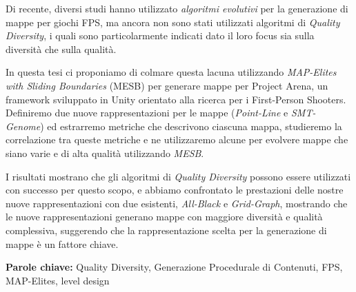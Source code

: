 \documentclass{Configuration_Files/PoliMi3i_thesis}
\begin{document}
Di recente, diversi studi hanno utilizzato \textit{algoritmi evolutivi} per la generazione di mappe per giochi FPS, ma ancora non sono stati utilizzati algoritmi di \textit{Quality Diversity}, i quali sono particolarmente indicati dato il loro focus sia sulla diversità che sulla qualità.

In questa tesi ci proponiamo di colmare questa lacuna utilizzando \textit{MAP-Elites with Sliding Boundaries} (MESB) per generare mappe per Project Arena, un framework sviluppato in Unity orientato alla ricerca per i First-Person Shooters. Definiremo due nuove rappresentazioni per le mappe (\textit{Point-Line} e \textit{SMT-Genome}) ed estrarremo metriche che descrivono ciascuna mappa, studieremo la correlazione tra queste metriche e ne utilizzaremo alcune per evolvere mappe che siano varie e di alta qualità utilizzando \textit{MESB}.

I risultati mostrano che gli algoritmi di \textit{Quality Diversity} possono essere utilizzati con successo per questo scopo, e abbiamo confrontato le prestazioni delle nostre nuove rappresentazioni con due esistenti, \textit{All-Black} e \textit{Grid-Graph}, mostrando che le nuove rappresentazioni generano mappe con maggiore diversità e qualità complessiva, suggerendo che la rappresentazione scelta per la generazione di mappe è un fattore chiave.



\textbf{Parole chiave:} Quality Diversity, Generazione Procedurale di Contenuti, FPS, MAP-Elites, level design %


\thispagestyle{empty}
\tableofcontents %
\thispagestyle{empty}
\cleardoublepage

%
%
%    
%
\end{document}
